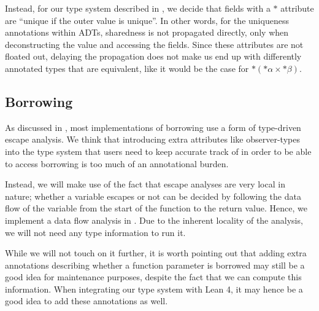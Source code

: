 Instead, for our type system described in , we decide that fields with a $*$ attribute are ``unique if the outer value is unique''. In other words, for the uniqueness annotations within ADTs, sharedness is not propagated directly, only when deconstructing the value and accessing the fields. Since these attributes are not floated out, delaying the propagation does not make us end up with differently annotated types that are equivalent, like it would be the case for $*(*\alpha \times *\beta)$.

\subsection{Borrowing}
As discussed in , most implementations of borrowing use a form of type-driven escape analysis. We think that introducing extra attributes like observer-types into the type system that users need to keep accurate track of in order to be able to access borrowing is too much of an annotational burden.

Instead, we will make use of the fact that escape analyses are very local in nature; whether a variable escapes or not can be decided by following the data flow of the variable from the start of the function to the return value. Hence, we implement a data flow analysis \cite{allen_program_1976} in . Due to the inherent locality of the analysis, we will not need any type information to run it.

While we will not touch on it further, it is worth pointing out that adding extra annotations describing whether a function parameter is borrowed may still be a good idea for maintenance purposes, despite the fact that we can compute this information. When integrating our type system with Lean 4, it may hence be a good idea to add these annotations as well.